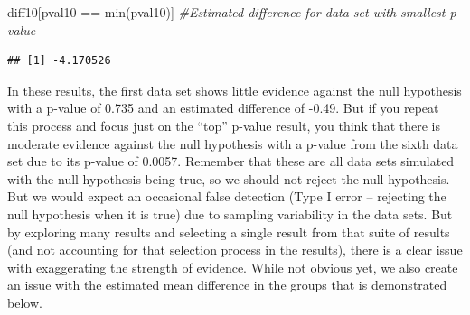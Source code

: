 \documentclass[
]{book}
\newenvironment{Shaded}{\begin{snugshade}}{\end{snugshade}}
\newcommand{\CommentTok}[1]{\textcolor[rgb]{0.56,0.35,0.01}{\textit{#1}}}
\newcommand{\FunctionTok}[1]{\textcolor[rgb]{0.00,0.00,0.00}{#1}}
\newcommand{\NormalTok}[1]{#1}
\newcommand{\SpecialCharTok}[1]{\textcolor[rgb]{0.00,0.00,0.00}{#1}}
\begin{document}
\begin{Shaded}
\begin{Highlighting}[]
\NormalTok{diff10[pval10 }\SpecialCharTok{==} \FunctionTok{min}\NormalTok{(pval10)] }\CommentTok{\#Estimated difference for data set with smallest p{-}value}
\end{Highlighting}
\end{Shaded}

\begin{verbatim}
## [1] -4.170526
\end{verbatim}

\indent In these results, the first data set shows little evidence against the null hypothesis with a p-value of 0.735 and an estimated difference of -0.49. But if you repeat this process and focus just on the ``top'' p-value result, you think that there is moderate evidence against the null hypothesis with a p-value from the sixth data set due to its p-value of 0.0057. Remember that these are all data sets simulated with the null hypothesis being true, so we should not reject the null hypothesis. But we would expect an occasional false detection (Type I error -- rejecting the null hypothesis when it is true) due to sampling variability in the data sets. But by exploring many results and selecting a single result from that suite of results (and not accounting for that selection process in the results), there is a clear issue with exaggerating the strength of evidence. While not obvious yet, we also create an issue with the estimated mean difference in the groups that is demonstrated below.
\end{document}
